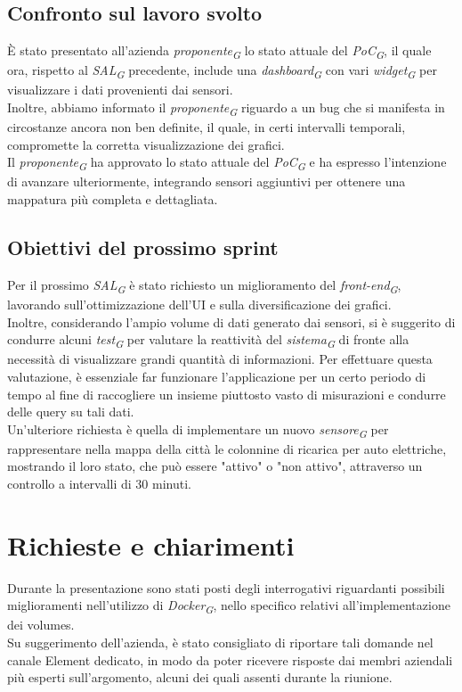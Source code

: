 \documentclass{article}
\begin{document}
    \subsection{Confronto sul lavoro svolto}
    È stato presentato all'azienda \textit{proponente}\textsubscript{\textit{G}} lo stato attuale del \textit{PoC}\textsubscript{\textit{G}}, il quale ora, rispetto al \textit{SAL}\textsubscript{\textit{G}} precedente, include una \textit{dashboard}\textsubscript{\textit{G}} con vari \textit{widget}\textsubscript{\textit{G}} per visualizzare i dati provenienti dai sensori.\\
    Inoltre, abbiamo informato il \textit{proponente}\textsubscript{\textit{G}} riguardo a un bug che si manifesta in circostanze ancora non ben definite, il quale, in certi intervalli temporali, compromette la corretta visualizzazione dei grafici.\\
    Il \textit{proponente}\textsubscript{\textit{G}} ha approvato lo stato attuale del \textit{PoC}\textsubscript{\textit{G}} e ha espresso l'intenzione di avanzare ulteriormente, integrando sensori aggiuntivi per ottenere una mappatura più completa e dettagliata.

    \subsection{Obiettivi del prossimo sprint}
    Per il prossimo \textit{SAL}\textsubscript{\textit{G}} è stato richiesto un miglioramento del \textit{front-end}\textsubscript{\textit{G}}, lavorando sull'ottimizzazione dell'UI e sulla diversificazione dei grafici.\\
    Inoltre, considerando l'ampio volume di dati generato dai sensori, si è suggerito di condurre alcuni \textit{test}\textsubscript{\textit{G}} per valutare la reattività del \textit{sistema}\textsubscript{\textit{G}} di fronte alla necessità di visualizzare grandi quantità di informazioni. Per effettuare questa valutazione, è essenziale far funzionare l'applicazione per un certo periodo di tempo al fine di raccogliere un insieme piuttosto vasto di misurazioni e condurre delle query su tali dati.\\
    Un'ulteriore richiesta è quella di implementare un nuovo \textit{sensore}\textsubscript{\textit{G}} per rappresentare nella mappa della città le colonnine di ricarica per auto elettriche, mostrando il loro stato, che può essere "attivo" o "non attivo", attraverso un controllo a intervalli di 30 minuti. 

\section{Richieste e chiarimenti}
    Durante la presentazione sono stati posti degli interrogativi riguardanti possibili miglioramenti nell'utilizzo di \textit{Docker}\textsubscript{\textit{G}}, nello specifico relativi all'implementazione dei volumes. \\
    Su suggerimento dell'azienda, è stato consigliato di riportare tali domande nel canale Element dedicato, in modo da poter ricevere risposte dai membri aziendali più esperti sull'argomento, alcuni dei quali assenti durante la riunione.  
\end{document}
